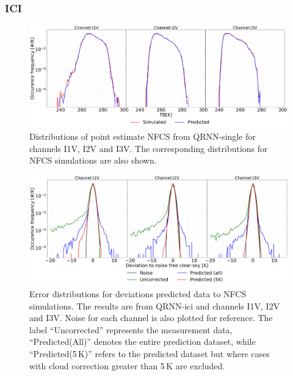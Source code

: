 \documentclass[amt, manuscript]{copernicus}
\begin{document}
\subsubsection{ICI}
%
\begin{figure}[t]
	\includegraphics[width=\textwidth]{Figures/PDF_predictions_ICI.pdf} 
	\caption{Distributions of point estimate NFCS from QRNN-single for channels I1V, I2V and I3V. The corresponding distributions for NFCS simulations are also shown.}
	\label{fig:PDF_predictions}	
\end{figure}
\begin{figure}[t ]
	\includegraphics[width=\textwidth]{Figures/error_distribution_QRNN-single.pdf} 
	\caption{Error distributions for deviations predicted data to NFCS simulations. The results are from QRNN-ici and channels I1V, I2V and I3V. Noise for each channel is also plotted for reference. The label ``Uncorrected'' represents the measurement data, ``Predicted(All)'' denotes the entire prediction dataset, while ``Predicted(5\,K)'' refers to the predicted dataset but where cases with cloud correction greater than 5\,K are excluded.}
	\label{fig:error_distributions}	
\end{figure}
\end{document}
